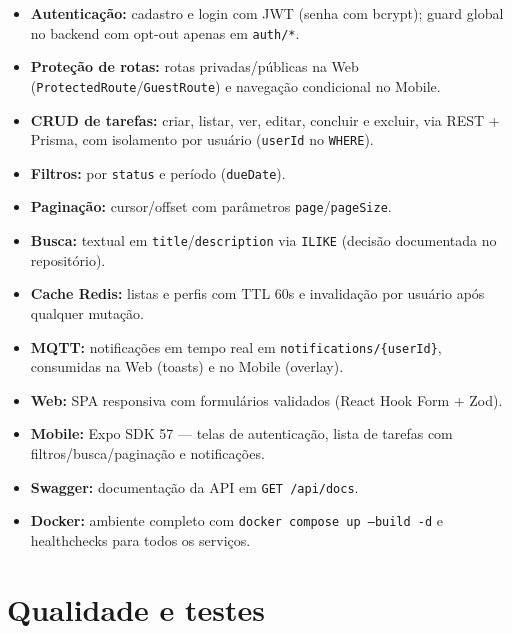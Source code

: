 \documentclass[11pt,a4paper]{article}
\begin{document}
\begin{itemize}[leftmargin=1.4em,itemsep=2pt]
  \item \textbf{Autenticação:} cadastro e login com JWT (senha com bcrypt);
        guard global no backend com opt-out apenas em \texttt{auth/*}.
  \item \textbf{Proteção de rotas:} rotas privadas/públicas na Web
        (\texttt{ProtectedRoute}/\texttt{GuestRoute}) e navegação condicional no Mobile.
  \item \textbf{CRUD de tarefas:} criar, listar, ver, editar, concluir e excluir,
        via REST + Prisma, com isolamento por usuário (\texttt{userId} no \texttt{WHERE}).
  \item \textbf{Filtros:} por \texttt{status} e período (\texttt{dueDate}).
  \item \textbf{Paginação:} cursor/offset com parâmetros \texttt{page}/\texttt{pageSize}.
  \item \textbf{Busca:} textual em \texttt{title}/\texttt{description} via
        \texttt{ILIKE} (decisão documentada no repositório).
  \item \textbf{Cache Redis:} listas e perfis com TTL 60s e invalidação
        por usuário após qualquer mutação.
  \item \textbf{MQTT:} notificações em tempo real em \texttt{notifications/\{userId\}},
        consumidas na Web (toasts) e no Mobile (overlay).
  \item \textbf{Web:} SPA responsiva com formulários validados (React Hook Form + Zod).
  \item \textbf{Mobile:} Expo SDK 57 --- telas de autenticação, lista de tarefas com
        filtros/busca/paginação e notificações.
  \item \textbf{Swagger:} documentação da API em \texttt{GET /api/docs}.
  \item \textbf{Docker:} ambiente completo com \texttt{docker compose up --build -d}
        e healthchecks para todos os serviços.
\end{itemize}

\section{Qualidade e testes}
\end{document}
